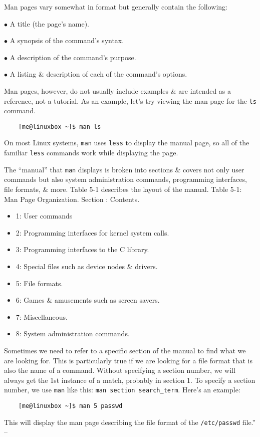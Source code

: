 \documentclass[oneside]{book}
\numberwithin{equation}{section}
\begin{document}
Man pages vary somewhat in format but generally contain the following:
\begin{enumerate*}
	\item[$\bullet$] A title (the page's name).
	\item[$\bullet$] A synopsis of the command's syntax.
	\item[$\bullet$] A description of the command's purpose.
	\item[$\bullet$] A listing \& description of each of the command's options.
\end{enumerate*}

Man pages, however, do not usually include examples \& are intended as a reference, not a tutorial. As an example, let's try viewing the man page for the \texttt{ls} command.
\begin{verbatim}
	[me@linuxbox ~]$ man ls
\end{verbatim}
On most Linux systems, \texttt{man} uses \texttt{less} to display the manual page, so all of the familiar \texttt{less} commands work while displaying the page.

The ``manual'' that \texttt{man} displays is broken into sections \& covers not only user commands but also system administration commands, programming interfaces, file formats, \& more. Table 5-1 describes the layout of the manual. \textsf{Table 5-1: Man Page Organization. Section : Contents}.
\begin{itemize}
	\item 1: User commands
	\item 2: Programming interfaces for kernel system calls.
	\item 3: Programming interfaces to the C library.
	\item 4: Special files such as device nodes \& drivers.
	\item 5: File formats.
	\item 6: Games \& amusements such as screen savers.
	\item 7: Miscellaneous.
	\item 8: System administration commands.
\end{itemize}
Sometimes we need to refer to a specific section of the manual to find what we are looking for. This is particularly true if we are looking for a file format that is also the name of a command. Without specifying a section number, we will always get the 1st instance of a match, probably in section 1. To specify a section number, we use \texttt{man} like this: \verb|man section search_term|. Here's an example:
\begin{verbatim}
	[me@linuxbox ~]$ man 5 passwd
\end{verbatim}
This will display the man page describing the file format of the \texttt{/etc/passwd} file.'' -- \cite[pp. 87--89]{Shotts2019}
\end{document}
